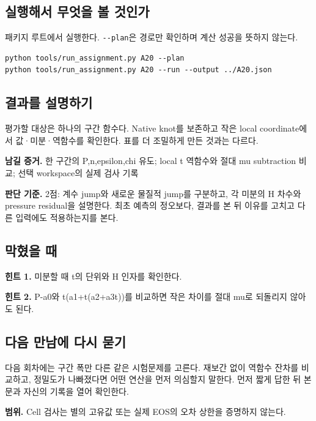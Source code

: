 \documentclass[
  10pt,
  a4paper,
]{article}
\begin{document}
\newpage

\subsection{실행해서 무엇을 볼
것인가}\label{uxc2e4uxd589uxd574uxc11c-uxbb34uxc5c7uxc744-uxbcfc-uxac83uxc778uxac00}

패키지 루트에서 실행한다. \texttt{-\/-plan}은 경로만 확인하며 계산
성공을 뜻하지 않는다.

\begin{verbatim}
python tools/run_assignment.py A20 --plan
python tools/run_assignment.py A20 --run --output ../A20.json
\end{verbatim}

\subsection{결과를
설명하기}\label{uxacb0uxacfcuxb97c-uxc124uxba85uxd558uxae30}

평가할 대상은 하나의 구간 함수다. Native knot를 보존하고 작은 local
coordinate에서 값·미분·역함수를 확인한다. 표를 더 조밀하게 만든 것과는
다르다.

\textbf{남길 증거.} 한 구간의 P,n,epsilon,chi 유도; local t 역함수와
절대 mu subtraction 비교; 선택 workspace의 실제 검사 기록

\textbf{판단 기준.} 2점: 계수 jump와 새로운 물질적 jump를 구분하고, 각
미분의 H 차수와 pressure residual을 설명한다. 최초 예측의 정오보다,
결과를 본 뒤 이유를 고치고 다른 입력에도 적용하는지를 본다.

\subsection{막혔을 때}\label{uxb9c9uxd614uxc744-uxb54c}

\textbf{힌트 1.} 미분할 때 t의 단위와 H 인자를 확인한다.

\textbf{힌트 2.} P-a0와 t(a1+t(a2+a3t))를 비교하면 작은 차이를 절대 mu로
되돌리지 않아도 된다.

\subsection{다음 만남에 다시
묻기}\label{uxb2e4uxc74c-uxb9ccuxb0a8uxc5d0-uxb2e4uxc2dc-uxbb3buxae30}

다음 회차에는 구간 폭만 다른 같은 시험문제를 고른다. 재보간 없이 역함수
잔차를 비교하고, 정밀도가 나빠졌다면 어떤 연산을 먼저 의심할지 말한다.
먼저 짧게 답한 뒤 본문과 자신의 기록을 열어 확인한다.

\textbf{범위.} Cell 검사는 별의 고유값 또는 실제 EOS의 오차 상한을
증명하지 않는다.
\end{document}
